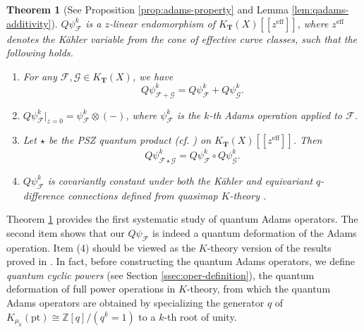 \documentclass[reqno]{amsart}
\numberwithin{equation}{section}
\numberwithin{equation}{section}
\numberwithin{equation}{section}
\newtheorem{thm}{Theorem}[section]
\theoremstyle{definition}
\theoremstyle{remark}
\theoremstyle{remark}
\begin{document}
\begin{thm}[See Proposition \ref{prop:adams-property} and Lemma \ref{lem:qadams-additivity}]\label{thm:intro-1}
$Q\psi_{\mathcal{F}}^k$ is a $z$-linear endomorphism of $K_{\mathbf{T}}(X)[\![ z^{\mathrm{eff}} ]\!]$, where $z^{\mathrm{eff}}$ denotes the K\"ahler variable from the cone of effective curve classes, such that the following holds.
    \begin{enumerate}
        \item For any $\mathcal{F}, \mathcal{G} \in K_{\mathbf{T}}(X)$, we have
        \begin{equation}
            Q\psi_{\mathcal{F} + \mathcal{G}}^k = Q\psi_{\mathcal{F}}^k + Q\psi_{\mathcal{G}}^k.
        \end{equation}
        \item $Q\psi_{\mathcal{F}}^k |_{z=0} = \psi^k_{\mathcal{F}} \otimes (-)$, where $\psi^k_{\mathcal{F}}$ is the $k$-th Adams operation applied to $\mathcal{F}$.
        \item Let $\star$ be the PSZ quantum product (cf. \cite{PSZ-quantum}) on $K_{\mathbf{T}}(X)[\![ z^{\mathrm{eff}} ]\!]$. Then
        \begin{equation}
            Q\psi_{\mathcal{F} \star \mathcal{G}}^k = Q\psi_{\mathcal{F}}^k \circ Q\psi_{\mathcal{G}}^k.
        \end{equation}
        \item $Q\psi_{\mathcal{F}}^k$ is covariantly constant under both the K\"ahler and equivariant $q$-difference connections defined from quasimap $K$-theory \cite{Oko17}.
    \end{enumerate}
\end{thm}

Theorem \ref{thm:intro-1} provides the first systematic study of quantum Adams operators. The second item shows that our $Q\psi_{\mathcal{F}}$ is indeed a quantum deformation of the Adams operation. Item (4) should be viewed as the $K$-theory version of the results proved in \cite{seidel-wilkins,Lee23b}. In fact, before constructing the quantum Adams operators, we define \emph{quantum cyclic powers} (see Section \ref{ssec:oper-definition}), the quantum deformation of full power operations in $K$-theory, from which the quantum Adams operators are obtained by specializing the generator $q$ of $K_{\mu_k}(\mathrm{pt}) \cong \mathbb{Z}[q]/(q^k=1)$ to a $k$-th root of unity.
\end{document}

